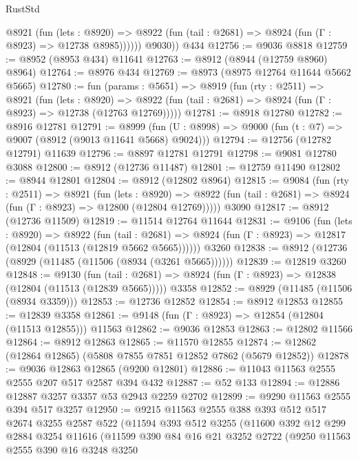 \begin{lexlean}{RustStd}
\begin{coremodule}
            @8921
              (fun (lets : @8920) =>
              @8922 (fun (tail : @2681) => @8924 (fun (Γ : @8923) => @12738 @8985))))))
        @9030))
    @434
@12756 := @9036 @8818
@12759 := @8952 (@8953 @434) @11641
@12763 := @8912 (@8944 (@12759 @8960) @8964)
@12764 := @8976 @434
@12769 := @8973 (@8975 @12764 @11644 @5662 @5665)
@12780 := fun (params : @5651) =>
  @8919
    (fun (rty : @2511) =>
    @8921
      (fun (lets : @8920) =>
      @8922 (fun (tail : @2681) => @8924 (fun (Γ : @8923) => @12738 (@12763 @12769)))))
@12781 := @8918 @12780
@12782 := @8916 @12781
@12791 := @8999
    (fun (U : @8998) => @9000 (fun (t : @7) => @9007 (@8912 (@9013 @11641 @5668) @9024)))
@12794 := @12756 (@12782 @12791) @11639
@12796 := @8897 @12781 @12791
@12798 := @9081 @12780 @3088
@12800 := @8912 (@12736 @11487)
@12801 := @12759 @11490
@12802 := @8944 @12801
@12804 := @8912 (@12802 @8964)
@12815 := @9084
    (fun (rty : @2511) =>
    @8921
      (fun (lets : @8920) =>
      @8922 (fun (tail : @2681) => @8924 (fun (Γ : @8923) => @12800 (@12804 @12769)))))
    @3090
@12817 := @8912 (@12736 @11509)
@12819 := @11514 @12764 @11644
@12831 := @9106
    (fun (lets : @8920) =>
    @8922
      (fun (tail : @2681) =>
      @8924 (fun (Γ : @8923) => @12817 (@12804 (@11513 (@12819 @5662 @5665))))))
    @3260
@12838 := @8912 (@12736 (@8929 (@11485 (@11506 (@8934 (@3261 @5665))))))
@12839 := @12819 @3260
@12848 := @9130
    (fun (tail : @2681) => @8924 (fun (Γ : @8923) => @12838 (@12804 (@11513 (@12839 @5665)))))
    @3358
@12852 := @8929 (@11485 (@11506 (@8934 @3359)))
@12853 := @12736 @12852
@12854 := @8912 @12853
@12855 := @12839 @3358
@12861 := @9148 (fun (Γ : @8923) => @12854 (@12804 (@11513 @12855))) @11563
@12862 := @9036 @12853
@12863 := @12802 @11566
@12864 := @8912 @12863
@12865 := @11570 @12855
@12874 := @12862 (@12864 @12865) (@5808 @7855 @7851 @12852 @7862 (@5679 @12852))
@12878 := @9036 @12863 @12865 (@9200 @12801)
@12886 := @11043 @11563 @2555 @2555 @207 @517 @2587 @394 @432
@12887 := @52 @133
@12894 := @12886 @12887 @3257 @3357 @53 @2943 @2259 @2702
@12899 := @9290 @11563 @2555 @394 @517 @3257
@12950 := @9215
    @11563
    @2555
    @388
    @393
    @512
    @517
    @2674
    @3255
    @2587
    @522
    (@11594
      @393
      @512
      @3255
      (@11600
        @392
        @12
        @299
        @2884
        @3254
        @11616
        (@11599
          @390
          @84
          @16
          @21
          @3252
          @2722
          (@9250
            @11563
            @2555
            @390
            @16
            @3248
            @3250

\end{coremodule}
\end{lexlean}
